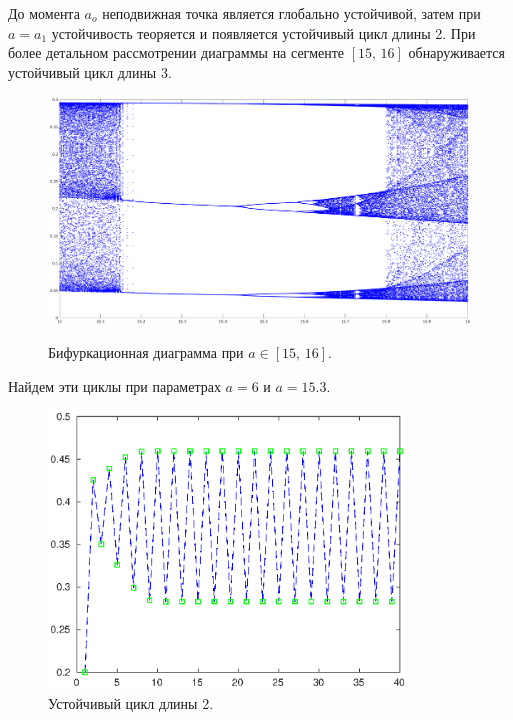 \documentclass[16pt]{article}
\begin{document}
До момента $a_o$ неподвижная точка является глобально устойчивой, затем при $a = a_1$ устойчивость теоряется 
и появляется
устойчивый цикл длины 2. При более детальном рассмотрении диаграммы на сегменте $[15,\,16]$ обнаруживается
устойчивый цикл длины 3. 

\begin{figure}[h]
\begin{center}
\includegraphics[width=140mm]{bif2.eps} \label{bif2}
\caption{Бифуркационная диаграмма при $a \in [15,\, 16]$.}
\end{center}
\end{figure}

\newpage
Найдем эти циклы при параметрах $a = 6$ и $a = 15.3$.

\begin{figure}[h]
\begin{center}
\includegraphics[width=95mm]{cycle2.eps}
\caption{Устойчивый цикл длины 2.}
\end{center}
\end{figure}
\end{document}
